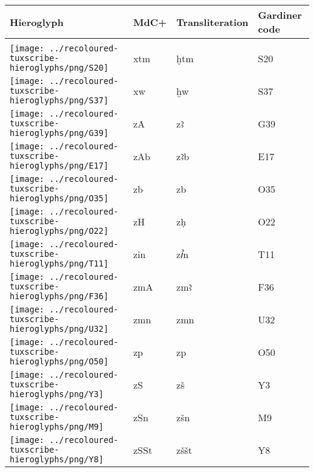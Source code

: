 \begin{center}
	\begin{tabularx}{\linewidth}{YYYY}
		Hieroglyph & MdC+ & Transliteration & Gardiner code\\
		\hline\\
		\texttt{[image: ../recoloured-tuxscribe-hieroglyphs/png/S20]} & xtm & ḫtm & S20 \\ 
		\texttt{[image: ../recoloured-tuxscribe-hieroglyphs/png/S37]} & xw & ḫw & S37 \\ 
		\texttt{[image: ../recoloured-tuxscribe-hieroglyphs/png/G39]} & zA & zꜣ & G39 \\ 
		\texttt{[image: ../recoloured-tuxscribe-hieroglyphs/png/E17]} & zAb & zꜣb & E17 \\ 
		\texttt{[image: ../recoloured-tuxscribe-hieroglyphs/png/O35]} & zb & zb & O35 \\ 
		\texttt{[image: ../recoloured-tuxscribe-hieroglyphs/png/O22]} & zH & zḥ & O22 \\ 
		\texttt{[image: ../recoloured-tuxscribe-hieroglyphs/png/T11]} & zin & zꞽn & T11 \\ 
		\texttt{[image: ../recoloured-tuxscribe-hieroglyphs/png/F36]} & zmA & zmꜣ & F36 \\ 
		\texttt{[image: ../recoloured-tuxscribe-hieroglyphs/png/U32]} & zmn & zmn & U32 \\ 
		\texttt{[image: ../recoloured-tuxscribe-hieroglyphs/png/O50]} & zp & zp & O50 \\ 
		\texttt{[image: ../recoloured-tuxscribe-hieroglyphs/png/Y3]} & zS & zš & Y3 \\ 
		\texttt{[image: ../recoloured-tuxscribe-hieroglyphs/png/M9]} & zSn & zšn & M9 \\ 
		\texttt{[image: ../recoloured-tuxscribe-hieroglyphs/png/Y8]} & zSSt & zššt & Y8 \\ 
	\end{tabularx}
\end{center}


